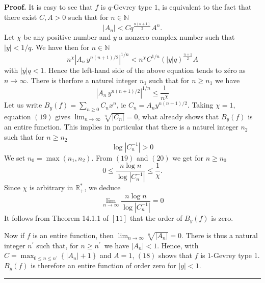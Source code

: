 \documentclass{article}
\newenvironment{proof}[1][Proof]{\textbf{#1.} }{\ \rule{0.5em}{0.5em}}
\begin{document}
\begin{proof}
It is easy to see that $f$ is $q$-Gevrey type $1$, is equivalent to the fact
that there exist $C,A>0$ such that for $n\in \mathbb{N}$\begin{equation}
\left| A_{n}\right| <Cq^{\tfrac{n\left( n+1\right) }{2}}A^{n}\text{.}
\end{equation}
Let $\chi $ be any positive number and $y$ a nonzero complex number such
that $\left| y\right| <1/q$. We have then for $n\in \mathbb{N}$ 
\begin{equation*}
n^{\chi }\left| A_{n}\,y^{n\left( n+1\right) /2}\right| ^{1/n}<n^{\chi
}C^{1/n}\left( \left| y\right| q\right) ^{\tfrac{n+1}{2}}A
\end{equation*}
with $\left| y\right| q<1.$ Hence the left-hand side of the above equation
tends to z\'{e}ro as $n\longrightarrow \infty $. There is therfore a naturel
integer $n_{1}$ such that for $n\geq n_{1}$ we have 
\begin{equation}
\left| A_{n}\,y^{n\left( n+1\right) /2}\right| ^{1/n}\leq \dfrac{1}{n^{\chi }}
\end{equation}
Let us write $B_{y}\left( f\right) =\sum_{n\geq 0}C_{n}x^{n}$, ie $C_{n}=A_{n}y^{n\left( n+1\right) /2}$. Taking $\chi =1$, equation $\left(
19\right) $ gives $\lim_{n\rightarrow \infty }\sqrt[n]{\left| C_{n}\right| }=0$, what already shows that $B_{y}\left( f\right) $ is an entire function.
This implies in particular that there is a naturel integer $n_{2}$ such that
for $n\geq n_{2}$ 
\begin{equation}
\log \left| C_{n}^{-1}\right| >0
\end{equation}
We set $n_{0}=\max \left( n_{1},n_{2}\right) $. From $\left( 19\right) $ and 
$\left( 20\right) $ we get for $n\geq n_{0}$ 
\begin{equation*}
0\leq \dfrac{n\log n}{\log \left| C_{n}^{-1}\right| }\leq \dfrac{1}{\chi }.
\end{equation*}
Since $\chi $ is arbitrary in $\mathbb{R}_{+}^{\ast }$, we deduce 
\begin{equation*}
\lim_{n\rightarrow \infty }\dfrac{n\log n}{\log \left| C_{n}^{-1}\right| }=0
\end{equation*}
It follows from Theorem 14.1.1 of $\left[ 11\right] $ that the order of $B_{y}\left( f\right) $ is zero.

Now if $f$ is an entire function, then $\lim_{n\rightarrow \infty }\sqrt[n]{\left| A_{n}\right| }=0$. There is thus a natural integer $n^{\prime }$ such
that, for $n\geq n^{\prime }$\ we have $\left| A_{n}\right| <1$. Hence, with 
$C=\max_{0\leq n\leq n^{\prime }}\left\{ \left| A_{n}\right| +1\right\} $
and $A=1$, $\left( 18\right) $ shows that $f$ is $1$-Gevrey type 1. $B_{y}\left( f\right) $ is therefore an entire function of order zero for $\left| y\right| <1$.
\end{proof}
\end{document}
